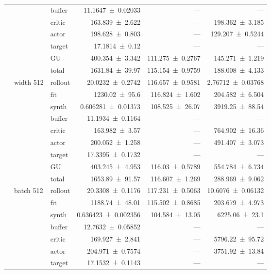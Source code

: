 {\begin{longtable}{@{}lllrrr@{}}
     &  & buffer & \num{11.1647+-0.02033} & --- & --- \\
     &  & critic & \num{163.839+-2.622} & --- & \num{198.362+-3.185} \\
     &  & actor & \num{198.628+-0.803} & --- & \num{129.207+-0.5244} \\
     &  & target & \num{17.1814+-0.12} & --- & --- \\
     &  & GU & \num{400.354+-3.342} & \num{111.275+-0.2767} & \num{145.271+-1.219} \\
     &  & total & \num{1631.84+-39.97} & \num{115.154+-0.9759} & \num{188.008+-4.133} \\
    \addlinespace[2pt]
     & width 512 & rollout & \num{20.0232+-0.2742} & \num{116.657+-0.9581} & \num{2.76712+-0.03768} \\
     &  & fit & \num{1230.02+-95.6} & \num{116.824+-1.602} & \num{204.582+-6.504} \\
     &  & synth & \num{0.606281+-0.01373} & \num{108.525+-26.07} & \num{3919.25+-88.54} \\
     &  & buffer & \num{11.1934+-0.1164} & --- & --- \\
     &  & critic & \num{163.982+-3.57} & --- & \num{764.902+-16.36} \\
     &  & actor & \num{200.052+-1.258} & --- & \num{491.407+-3.073} \\
     &  & target & \num{17.3395+-0.1732} & --- & --- \\
     &  & GU & \num{403.245+-4.953} & \num{116.03+-0.5789} & \num{554.784+-6.734} \\
     &  & total & \num{1653.89+-91.57} & \num{116.607+-1.269} & \num{288.969+-9.062} \\
    \addlinespace[2pt]
     & batch 512 & rollout & \num{20.3308+-0.1176} & \num{117.231+-0.5063} & \num{10.6076+-0.06132} \\
     &  & fit & \num{1188.74+-48.01} & \num{115.502+-0.8685} & \num{203.679+-4.973} \\
     &  & synth & \num{0.636423+-0.002356} & \num{104.584+-13.05} & \num{6225.06+-23.1} \\
     &  & buffer & \num{12.7632+-0.05852} & --- & --- \\
     &  & critic & \num{169.927+-2.841} & --- & \num{5796.22+-95.72} \\
     &  & actor & \num{204.971+-0.7574} & --- & \num{3751.92+-13.84} \\
     &  & target & \num{17.1532+-0.1143} & --- & --- \\

\end{longtable}}
